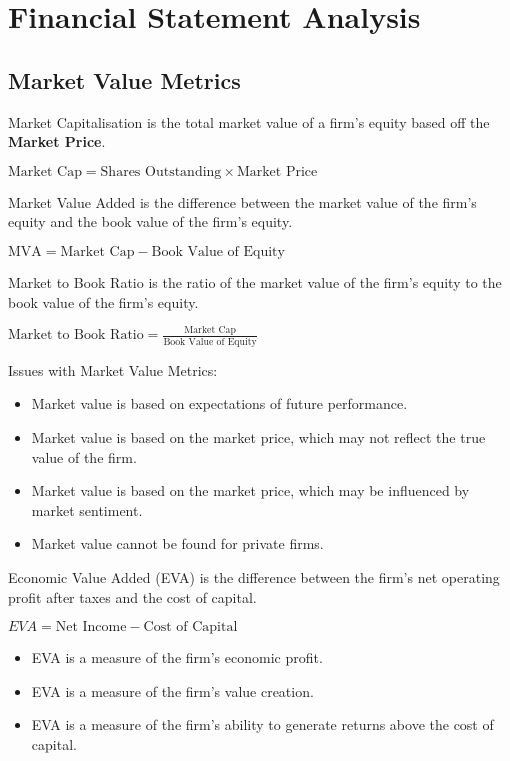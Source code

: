 \section{Financial Statement Analysis}

\subsection{Market Value Metrics}
Market Capitalisation is the total market value of a firm's equity based off the \textbf{Market Price}.

$\text{Market Cap} = \text{Shares Outstanding} \times \text{Market Price}$

Market Value Added is the difference between the market value of the firm's equity and the book value of the firm's equity.

$\text{MVA} = \text{Market Cap} - \text{Book Value of Equity}$

Market to Book Ratio is the ratio of the market value of the firm's equity to the book value of the firm's equity.

$\text{Market to Book Ratio} = \frac{\text{Market Cap}}{\text{Book Value of Equity}}$

Issues with Market Value Metrics:
\begin{itemize}
    \item Market value is based on expectations of future performance.
    \item Market value is based on the market price, which may not reflect the true value of the firm.
    \item Market value is based on the market price, which may be influenced by market sentiment.
    \item Market value cannot be found for private firms.
\end{itemize}

Economic Value Added (EVA) is the difference between the firm's net operating
profit after taxes and the cost of capital.

$EVA = \text{Net Income} - \text{Cost of Capital}$

\begin{itemize}
    \item EVA is a measure of the firm's economic profit.
    \item EVA is a measure of the firm's value creation.
    \item EVA is a measure of the firm's ability to generate returns above the cost of capital.
\end{itemize}

